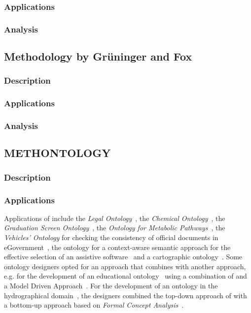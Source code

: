 \subsubsection{Applications}

\subsubsection{Analysis}

\subsection{Methodology by Grüninger and Fox}
\label{subsec:approach4}

\subsubsection{Description}

\subsubsection{Applications}

\subsubsection{Analysis}

\subsection{METHONTOLOGY}
\label{subsec:approach5}

\subsubsection{Description}

\subsubsection{Applications}

Applications of \methontology include the \emph{Legal Ontology}~\cite{MethontologyLegal}, the \emph{Chemical Ontology}~\cite{MethontologyChemical}, the \emph{Graduation Screen Ontology}~\cite{GraduationScreenOntology}, the \emph{Ontology for Metabolic Pathways}~\cite{MetabolicPathways}, the \emph{Vehicles' Ontology} for checking the consistency of official documents in eGovernment~\cite{VehiclesOntology}, the ontology for a context-aware semantic approach for the effective selection of an assistive software~\cite{AssistiveSoftware} and a cartographic ontology~\cite{CartographicOntology}. Some ontology designers opted for an approach that combines \methontology with another approach, e.g. for the development of an educational ontology~\cite{EducationalOntology} using a combination of \methontology and a Model Driven Approach~\cite{ModelDrivenApproach}. For the development of an ontology in the hydrographical domain~\cite{HydrographicalOntology}, the designers combined the top-down approach of \methontology with a bottom-up approach based on \emph{Formal Concept Analysis}~\cite{FormalConceptAnalysis}.

